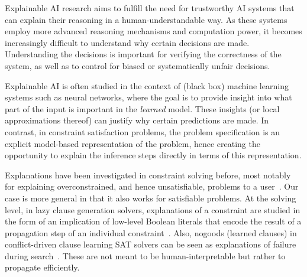 


Explainable AI research aims to fulfill the need for trustworthy AI systems that can explain their reasoning in a human-understandable way. 
As these systems employ more advanced reasoning mechanisms and computation power, it becomes increasingly difficult to understand why certain decisions are made. 
Understanding the decisions is important for verifying the correctness of the system, as well as to control for biased or systematically unfair decisions.

Explainable AI is often studied in the context of (black box) machine learning systems such as neural networks, where the goal is to provide insight into what part of the input is important in the \textit{learned} model. These insights (or local approximations thereof) can justify why certain predictions are made. In contrast, in constraint satisfaction problems, the problem specification is an explicit model-based representation of the problem, hence creating the opportunity to explain the inference steps directly in terms of this representation.

Explanations have been investigated in constraint solving before, most notably for explaining overconstrained, and hence unsatisfiable, problems to a user~\cite{junker2001quickxplain}. Our case is more general in that it also works for satisfiable problems. At the solving level, in lazy clause generation solvers, explanations of a constraint are studied in the form of an implication of low-level Boolean literals that encode the result of a propagation step of an individual constraint~\cite{feydy2009lazy}. Also, nogoods (learned clauses) in conflict-driven clause learning SAT solvers can be seen as explanations of failure during search~\cite{marques2009conflict}. These are not meant to be human-interpretable but rather to propagate efficiently.


